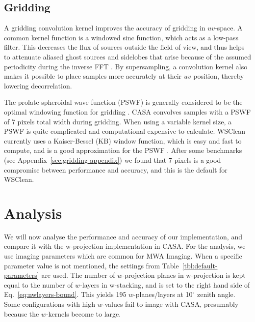 \documentclass[useAMS,usenatbib]{mn2e}
\newcommand{\degree}{\ensuremath{^{\circ}}\xspace}
\begin{document}
\subsection{Gridding} \label{sec:gridding}
A gridding convolution kernel improves the accuracy of gridding in $uv$-space. A common kernel function is a windowed sinc function, which acts as a low-pass filter. This decreases the flux of sources outside the field of view, and thus helps to attenuate aliased ghost sources and sidelobes that arise because of the assumed periodicity during the inverse FFT \citep{post-correlation-filtering}. By supersampling, a convolution kernel also makes it possible to place samples more accurately at their $uv$ position, thereby lowering decorrelation.

The prolate spheroidal wave function (PSWF) is generally considered to be the optimal windowing function for gridding \citep{fourier-kernel-selection-1991}. CASA convolves samples with a PSWF of 7 pixels total width during gridding. When using a variable kernel size, a PSWF is quite complicated and computational expensive to calculate. WSClean currently uses a Kaiser-Bessel (KB) window function, which is easy and fast to compute, and is a good approximation for the PSWF \citep{fourier-kernel-selection-1991}. After some benchmarks (see Appendix~\ref{sec:gridding-appendix}) we found that 7 pixels is a good compromise between performance and accuracy, and this is the default for WSClean.

\section{Analysis} \label{sec:analysis}
We will now analyse the performance and accuracy of our implementation, and compare it with the w-projection implementation in CASA. For the analysis, we use imaging parameters which are common for MWA Imaging. When a specific parameter value is not mentioned, the settings from Table~\ref{tbl:default-parameters} are used. The number of $w$-projection planes in w-projection is kept equal to the number of $w$-layers in w-stacking, and is set to the right hand side of Eq.~\eqref{eq:nwlayers-bound}. This yields 195 $w$-planes/layers at 10\degree zenith angle. Some configurations with high $w$-values fail to image with CASA, presumably because the $w$-kernels become to large.
\end{document}
